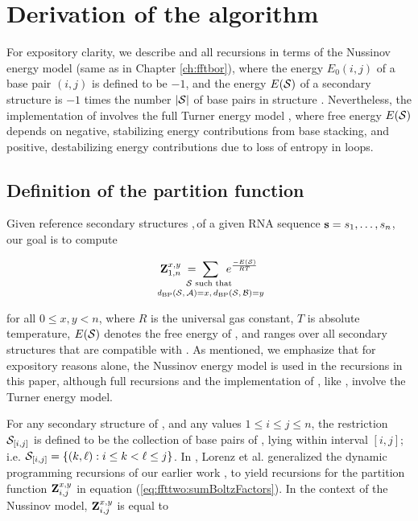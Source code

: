 
\section{Derivation of the \ffttwo algorithm}
\label{sec:ffttwo:math}

For expository clarity, we describe \ffttwo and all recursions
in terms of the Nussinov energy model \cite{nussinovJacobson}
(same as in Chapter \ref{ch:fftbor}), where
the energy $E_0(i,j)$ of a base pair $(i,j)$ is defined to be $-1$, and the
energy $E(\mathcal S)$ of a secondary structure \str is $-1$ times the number $|\mathcal S|$
of base pairs in structure \str.  Nevertheless, the implementation of
\ffttwo involves the full Turner energy model \cite{xia:RNA}, where
free energy $E(\mathcal S)$ depends on negative, stabilizing energy contributions
from base stacking, and positive, destabilizing energy contributions due to
loss of entropy in loops.

\subsection{Definition of the partition function
\texorpdfstring{}{}}
\label{subsec:ffttwo:recursions}

Given reference secondary structures \strA,\,\strB of a
given RNA sequence ${\bf s}=s_1,\dots,s_n$, our goal is to compute

\begin{align}
\label{eq:ffttwo:sumBoltzFactors}
\bfZ{x,y}{1,n}\;=\;
\sum_{\mathclap{\substack{
\str \text{ such that } \rule[-.5ex]{0pt}{0pt} \\
\dBP{\str}{\strA} = x,\,\dBP{\str}{\strB} = y}}}\enspace
\boltzF{\str}
\end{align}

for all $0 \leq x,y < n$, where $R$ is the universal gas constant, $T$
is absolute temperature, $E(\mathcal S)$ denotes the free energy of \str,
and \str ranges
over all secondary structures that are compatible with \seq. As mentioned,
we emphasize that for expository reasons alone, the Nussinov energy model is
used in the recursions in this paper, although full recursions and
the implementation of \ffttwo, like \fftbor, involve the Turner energy model.

For any secondary structure \str of \seq, and any values
$1 \leq i \leq j \leq n$, the restriction $\mathcal S_{[i,j]}$ is defined to be the
collection of base pairs of \str, lying within interval $[i,j]$; i.e.
$\mathcal S_{[i,j]} = \{ (k, \ell) : i \leq k < \ell \leq j \}$.
In \cite{hofacker:RNAbor2D}, Lorenz et al. generalized
the dynamic programming recursions of our earlier work \cite{Freyhult.b07},
to yield recursions
for the partition function ${\bf Z}^{x,y}_{i,j}$ in equation
(\ref{eq:ffttwo:sumBoltzFactors}). In the context of the Nussinov model,
${\bf Z}^{x,y}_{i,j}$ is equal to


